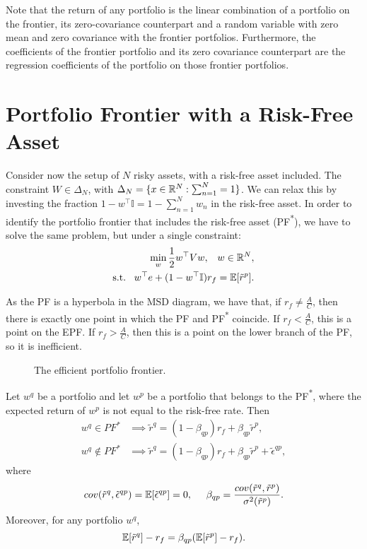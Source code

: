 \documentclass[twoside]{article}
\begin{document}
Note that the return of any portfolio is the linear combination of a portfolio on the frontier, its zero-covariance counterpart and a random variable with zero mean and zero covariance with the frontier portfolios. Furthermore, the coefficients of the frontier portfolio and its zero covariance counterpart are the regression coefficients of the portfolio on those frontier portfolios.


\section{Portfolio Frontier with a Risk-Free Asset}

Consider now the setup of $N$ risky assets, with a risk-free asset included. The constraint $W \in \Delta_N$, with $\Delta_N = \{x \in \mathbb{R}^N : \sum_{n=1}^{N} = 1\}$. We can relax this by investing the fraction $1 - w^\top \mathbb{I} = 1 - \sum_{n=1}^{N} w_n$ in the risk-free asset. In order to identify the portfolio frontier that includes the risk-free asset (PF\textsuperscript{*}), we have to solve the same problem, but under a single constraint:
\begin{align*}
    \min_w \frac{1}{2}w^\top V w, \;\;\; w \in \mathbb{R}^N, \\
    \text{s.t.} \;\;\; w^\top e + (1-w^\top \mathbb{I})r_f = \mathbb{E}[\tilde{r}^p].
\end{align*}

As the PF is a hyperbola in the MSD diagram, we have that, if $r_f \not= \frac{A}{C}$, then there is exactly one point in which the PF and PF\textsuperscript{*} coincide. If $r_f < \frac{A}{C}$, this is a point on the EPF. If $r_f > \frac{A}{C}$, then this is a point on the lower branch of the PF, so it is inefficient. 

\begin{figure}[ht]
    \centering
    \caption{The efficient portfolio frontier.}
    \label{fig:epf}
\end{figure}

\begin{proposition}
    Let $w^q$ be a portfolio and let $w^p$ be a portfolio that belongs to the PF\textsuperscript{*}, where the expected return of $w^p$ is not equal to the risk-free rate. Then
    \begin{align*}
        w^q \in PF^* &\implies \tilde{r}^q = (1-\beta_{qp})r_f + \beta_{qp}\tilde{r}^p, \\
        w^q \not\in PF^* &\implies \tilde{r}^q = (1-\beta_{qp})r_f + \beta_{qp}\tilde{r}^p + \tilde{\epsilon}^{qp},
    \end{align*}
    where
    \[
        cov(\tilde{r}^q, \tilde{\epsilon}^{qp}) = \mathbb{E}[\tilde{\epsilon}^{qp}] = 0, \;\;\;\;\; \beta_{qp} = \frac{cov(\tilde{r}^q, \tilde{r}^p)}{\sigma^2(\tilde{r}^p)}.
    \]
    Moreover, for any portfolio $w^q$,
    \[
        \mathbb{E}[\tilde{r}^q] - r_f = \beta_{qp}(\mathbb{E}[\tilde{r}^p] - r_f).
    \]
\end{proposition}
\end{document}
